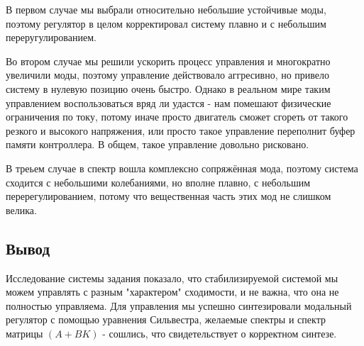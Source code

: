 В первом случае мы выбрали относительно небольшие устойчивые моды, поэтому регулятор в целом корректировал систему плавно и с небольшим переругулированием.

Во втором случае мы решили ускорить процесс управления и многократно увеличили моды, поэтому управление действовало аггресивно, но привело
систему в нулевую позицию очень быстро. Однако в реальном мире таким управлением воспользоваться вряд ли удастся - нам помешают физические ограничения по току, 
потому иначе просто двигатель сможет сгореть от такого резкого и высокого напряжения, или просто такое управление переполнит буфер памяти контроллера. В общем, такое управление довольно рисковано.

В треьем случае в спектр вошла комплексно сопряжённая мода, поэтому система сходится с небольшими колебаниями, но вполне плавно, с небольшим перерегулированием, потому что вещественная часть этих мод не слишком велика.




\subsection{Вывод}

Исследование системы задания показало, что стабилизируемой системой мы можем управлять с разным "характером" сходимости, и не важна, что она не полностью управляема. 
Для управления мы успешно синтезировали модальный регулятор с помощью уравнения Сильвестра, желаемые спектры и спектр матрицы $(A+BK)$ - сошлись, что свидетельствует о корректном синтезе.

\endinput
